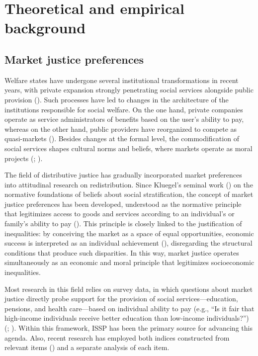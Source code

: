 \documentclass[
  spanish,
  a4paper,
  oneside]{scrbook}
\begin{document}

\chapter{Theoretical and empirical
background}\label{theoretical-and-empirical-background}

\section{Market justice preferences}\label{market-justice-preferences}

Welfare states have undergone several institutional transformations in
recent years, with private expansion strongly penetrating social
services alongside public provision
().
Such processes have led to changes in the architecture of the
institutions responsible for social welfare. On the one hand, private
companies operate as service administrators of benefits based on the
user's ability to pay, whereas on the other hand, public providers have
reorganized to compete as quasi-markets
(). Besides changes at the
formal level, the commodification of social services shapes cultural
norms and beliefs, where markets operate as moral projects
(;
).

The field of distributive justice has gradually incorporated market
preferences into attitudinal research on redistribution. Since Kluegel's
seminal work () on the
normative foundations of beliefs about social stratification, the
concept of market justice preferences has been developed, understood as
the normative principle that legitimizes access to goods and services
according to an individual's or family's ability to pay
(). This principle is closely
linked to the justification of inequalities: by conceiving the market as
a space of equal opportunities, economic success is interpreted as an
individual achievement (), disregarding the structural conditions that
produce such disparities. In this way, market justice operates
simultaneously as an economic and moral principle that legitimizes
socioeconomic inequalities.

Most research in this field relies on survey data, in which questions
about market justice directly probe support for the provision of social
services---education, pensions, and health care---based on individual
ability to pay (e.g., ``Is it fair that high-income individuals receive
better education than low-income individuals?'')
(;
). Within this framework,
ISSP has been the primary source for advancing this agenda. Also, recent
research has employed both indices constructed from relevant items
() and a separate analysis of each item.
\end{document}
